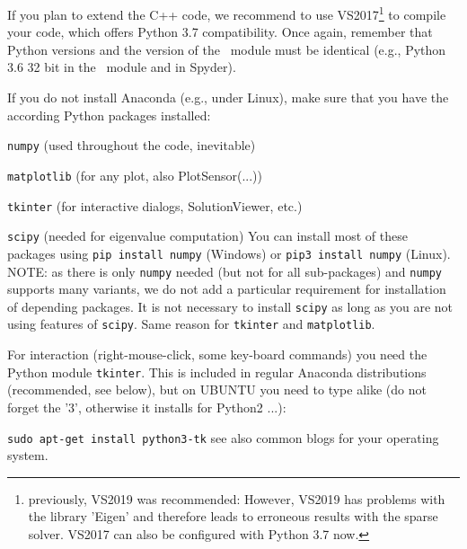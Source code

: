 \ei
If you plan to extend the C++ code, we recommend to use VS2017\footnote{previously, VS2019 was recommended: However, VS2019 has problems with the library 'Eigen' and therefore leads to erroneous results with the sparse solver. VS2017 can also be configured with Python 3.7 now.} to compile your code, which offers Python 3.7 compatibility.
Once again, remember that Python versions and the version of the \codeName\ module must be identical (e.g., Python 3.6 32 bit  in the \codeName\ module and in Spyder).

If you do not install Anaconda (e.g., under Linux), make sure that you have the according Python packages installed:
\bi
  \item \texttt{numpy} (used throughout the code, inevitable)
  \item \texttt{matplotlib} (for any plot, also PlotSensor(...))
  \item \texttt{tkinter} (for interactive dialogs, SolutionViewer, etc.)
  \item \texttt{scipy} (needed for eigenvalue computation)
\ei
You can install most of these packages using \texttt{pip install numpy} (Windows) or \texttt{pip3 install numpy} (Linux).
NOTE: as there is only \texttt{numpy} needed (but not for all sub-packages) and \texttt{numpy} supports many variants, we do not add a particular requirement for installation of depending packages. It is not necessary to install \texttt{scipy} as long as you are not using features of \texttt{scipy}. Same reason for \texttt{tkinter} and \texttt{matplotlib}.

For interaction (right-mouse-click, some key-board commands) you need the Python module \texttt{tkinter}. This is included in regular Anaconda distributions (recommended, see below), but on UBUNTU you need to type alike (do not forget the '3', otherwise it installs for Python2 ...):
\bi
  \item[] \texttt{sudo apt-get install python3-tk}
\ei
see also common blogs for your operating system.

